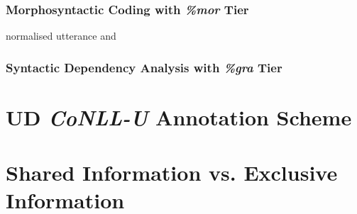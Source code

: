 \subsubsection{Morphosyntactic Coding with \emph{\%mor} Tier}
normalised utterance and %

\subsubsection{Syntactic Dependency Analysis with \emph{\%gra} Tier}

\section{UD \emph{CoNLL-U} Annotation Scheme}

\section{Shared Information vs. Exclusive Information}
